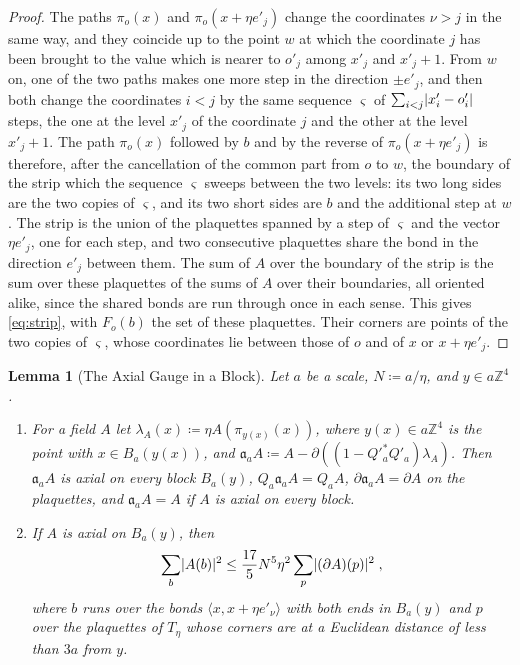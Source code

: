 \documentclass[11pt]{preprint}
\DeclarePairedDelimiter{\abs}{\lvert}{\rvert}
\numberwithin{equation}{section}
\newtheorem{lemma}[theorem]{Lemma}
\theoremstyle{definition}
\theoremstyle{remark}
\theoremstyle{plain}
\begin{document}
\begin{proof}
The paths $\pi_o(x)$ and $\pi_o(x + \eta e'_j)$ change the coordinates $\nu > j$ in the same way, and they coincide up to the point $w$ at which the coordinate $j$ has been brought to the value which is nearer to $o'_j$ among $x'_j$ and $x'_j + 1$. From $w$ on, one of the two paths makes one more step in the direction $\pm e'_j$, and then both change the coordinates $i < j$ by the same sequence $\varsigma$ of $\sum_{i < j}\abs{x'_i - o'_i}$ steps, the one at the level $x'_j$ of the coordinate $j$ and the other at the level $x'_j + 1$. The path $\pi_o(x)$ followed by $b$ and by the reverse of $\pi_o(x + \eta e'_j)$ is therefore, after the cancellation of the common part from $o$ to $w$, the boundary of the strip which the sequence $\varsigma$ sweeps between the two levels: its two long sides are the two copies of $\varsigma$, and its two short sides are $b$ and the additional step at $w$. The strip is the union of the plaquettes spanned by a step of $\varsigma$ and the vector $\eta e'_j$, one for each step, and two consecutive plaquettes share the bond in the direction $e'_j$ between them. The sum of $A$ over the boundary of the strip is the sum over these plaquettes of the sums of $A$ over their boundaries, all oriented alike, since the shared bonds are run through once in each sense. This gives \eqref{eq:strip}, with $F_o(b)$ the set of these plaquettes. Their corners are points of the two copies of $\varsigma$, whose coordinates lie between those of $o$ and of $x$ or $x + \eta e'_j$.
\end{proof}

\begin{lemma}[The Axial Gauge in a Block]\label{lem:axial-block}
Let $a$ be a scale, $N \coloneqq a/\eta$, and $y \in a\mathbb Z^4$.
\begin{enumerate}[label=(\roman*)]
\item For a field $A$ let $\lambda_A(x) \coloneqq \eta A(\pi_{y(x)}(x))$, where $y(x) \in a\mathbb Z^4$ is the point with $x \in B_a(y(x))$, and $\mathfrak a_aA \coloneqq A - \partial((1 - Q'^*_aQ'_a)\lambda_A)$. Then $\mathfrak a_aA$ is axial on every block $B_a(y)$, $Q_a\mathfrak a_aA = Q_aA$, $\partial\mathfrak a_aA = \partial A$ on the plaquettes, and $\mathfrak a_aA = A$ if $A$ is axial on every block.
\item If $A$ is axial on $B_a(y)$, then
\begin{equation}\label{eq:axial-block}
    \sum_b\abs{A(b)}^2 \leq \frac{17}{5}N^5\eta^2\sum_p\abs{(\partial A)(p)}^2\;,
\end{equation}
where $b$ runs over the bonds $\langle x, x + \eta e'_\nu\rangle$ with both ends in $B_a(y)$ and $p$ over the plaquettes of $T_\eta$ whose corners are at a Euclidean distance of less than $3a$ from $y$.
\end{enumerate}
\end{lemma}
\end{document}
